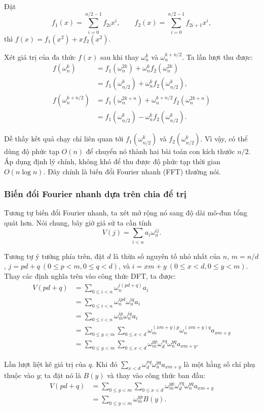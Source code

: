 \documentclass[11pt]{article}
\begin{document}
Đặt
\[
f_1(x)=\sum_{i=0}^{n/2-1}f_{2i}x^i,\qquad
f_2(x)=\sum_{i=0}^{n/2-1}f_{2i+1}x^i,
\]
thì \(f(x)=f_1(x^2)+xf_2(x^2)\).

Xét giá trị của đa thức \(f(x)\) sau khi thay \(\omega_n^k\) và
\(\omega_n^{k+n/2}\). Ta lần lượt thu được:
\[
\begin{aligned}
f(\omega_n^k)
&=f_1(\omega_n^{2k})+\omega_n^k f_2(\omega_n^{2k})\\
&=f_1(\omega_{n/2}^k)+\omega_n^k f_2(\omega_{n/2}^k),\\
f(\omega_n^{k+n/2})
&=f_1(\omega_n^{2k+n})+\omega_n^{k+n/2}f_2(\omega_n^{2k+n})\\
&=f_1(\omega_{n/2}^k)-\omega_n^k f_2(\omega_{n/2}^k).
\end{aligned}
\]

Dễ thấy kết quả chạy chỉ liên quan tới \(f_1(\omega_{n/2}^k)\) và
\(f_2(\omega_{n/2}^k)\). Vì vậy, có thể dùng độ phức tạp \(O(n)\) để chuyển nó
thành hai bài toán con kích thước \(n/2\). Áp dụng định lý chính, không khó để
thu được độ phức tạp thời gian \(O(n\log n)\). Đây chính là biến đổi Fourier
nhanh (FFT) thường nói.

\subsubsection{Biến đổi Fourier nhanh dựa trên chia để trị}

Tương tự biến đổi Fourier nhanh, ta xét mở rộng nó sang độ dài mô-đun tổng quát
hơn. Nói chung, bây giờ giả sử ta cần tính
\[
V(j)=\sum_{i<n}a_i\omega_n^{ij}.
\]

Tương tự ý tưởng phía trên, đặt \(d\) là thừa số nguyên tố nhỏ nhất của \(n\),
\(m=n/d\), \(j=pd+q\ (0\le p<m,0\le q<d)\), và
\(i=xm+y\ (0\le x<d,0\le y<m)\). Thay các định nghĩa trên vào công thức DFT, ta
được:
\[
\begin{aligned}
V(pd+q)
&=\sum_{0\le i<n}\omega_n^{i(pd+q)}a_i\\
&=\sum_{0\le i<n}\omega_n^{ipd}\omega_n^{iq}a_i\\
&=\sum_{0\le i<n}\omega_m^{ip}\omega_n^{iq}a_i\\
&=\sum_{0\le y<m}\sum_{0\le x<d}
  \omega_m^{(xm+y)p}\omega_n^{(xm+y)q}a_{xm+y}\\
&=\sum_{0\le y<m}\sum_{0\le x<d}
  \omega_m^{yp}\omega_d^{xq}\omega_n^{yq}a_{xm+y}.
\end{aligned}
\]

Lần lượt liệt kê giá trị của \(q\). Khi đó
\(\sum_{x<d}\omega_d^{xq}\omega_n^{yq}a_{xm+y}\) là một hằng số chỉ phụ thuộc
vào \(y\); ta đặt nó là \(B(y)\) và thay vào công thức ban đầu:
\[
\begin{aligned}
V(pd+q)
&=\sum_{0\le y<m}\sum_{0\le x<d}
  \omega_m^{yp}\omega_d^{xq}\omega_n^{yq}a_{xm+y}\\
&=\sum_{0\le y<m}\omega_m^{yp}B(y).
\end{aligned}
\]
\end{document}
